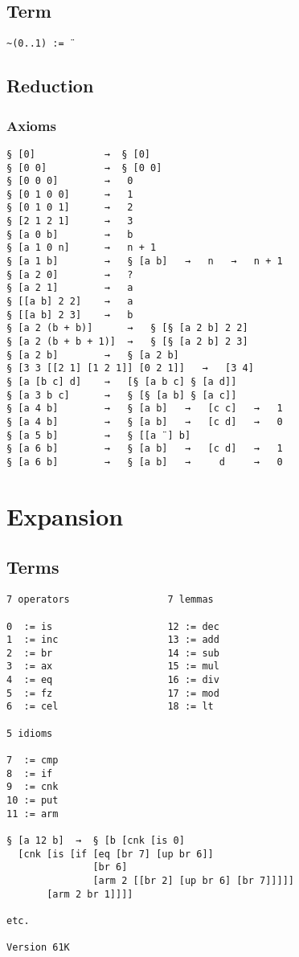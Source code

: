 \documentclass[twoside]{article}
\begin{document}
\subsection*{Term}

\begin{lstlisting}[style=listingcode_Ax]
~(0..1) := ¨
\end{lstlisting}

\subsection*{Reduction}

\subsubsection*{Axioms}

\begin{lstlisting}[style=listingcode_Ax]
§ [0]            →  § [0]
§ [0 0]          →  § [0 0]
§ [0 0 0]        →   0
§ [0 1 0 0]      →   1
§ [0 1 0 1]      →   2
§ [2 1 2 1]      →   3
§ [a 0 b]        →   b
§ [a 1 0 n]      →   n + 1
§ [a 1 b]        →   § [a b]   →   n   →   n + 1
§ [a 2 0]        →   ?
§ [a 2 1]        →   a
§ [[a b] 2 2]    →   a
§ [[a b] 2 3]    →   b
§ [a 2 (b + b)]      →   § [§ [a 2 b] 2 2]
§ [a 2 (b + b + 1)]  →   § [§ [a 2 b] 2 3]
§ [a 2 b]        →   § [a 2 b]
§ [3 3 [[2 1] [1 2 1]] [0 2 1]]   →   [3 4]
§ [a [b c] d]    →   [§ [a b c] § [a d]]
§ [a 3 b c]      →   § [§ [a b] § [a c]]
§ [a 4 b]        →   § [a b]   →   [c c]   →   1
§ [a 4 b]        →   § [a b]   →   [c d]   →   0
§ [a 5 b]        →   § [[a ¨] b]
§ [a 6 b]        →   § [a b]   →   [c d]   →   1
§ [a 6 b]        →   § [a b]   →     d     →   0
\end{lstlisting}

\newpage

\section*{Expansion}

\subsection*{Terms}

\begin{lstlisting}[style=listingcode_Ax]
7 operators                 7 lemmas

0  := is                    12 := dec
1  := inc                   13 := add
2  := br                    14 := sub
3  := ax                    15 := mul
4  := eq                    16 := div
5  := fz                    17 := mod
6  := cel                   18 := lt

5 idioms

7  := cmp
8  := if
9  := cnk
10 := put
11 := arm

§ [a 12 b]  →  § [b [cnk [is 0]
  [cnk [is [if [eq [br 7] [up br 6]]
               [br 6]
               [arm 2 [[br 2] [up br 6] [br 7]]]]]
       [arm 2 br 1]]]]

etc.

Version 61K
\end{lstlisting}
\end{document}
